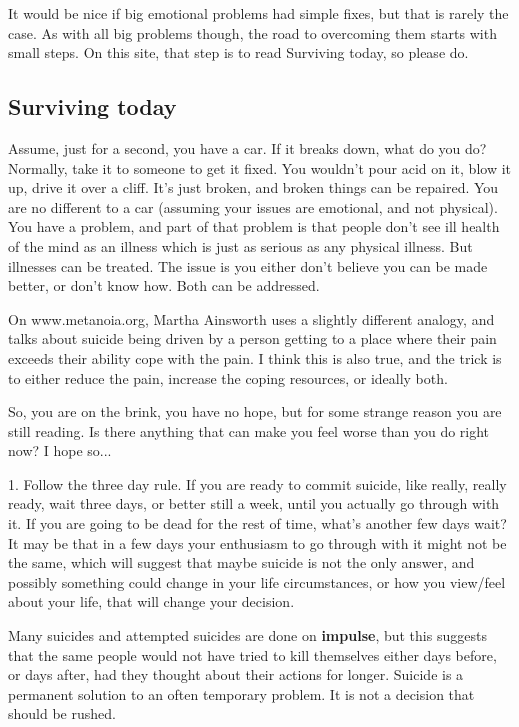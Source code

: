 \documentclass[12pt]{article}
\begin{document}
It would be nice if big emotional problems had simple fixes, but that is rarely the case. As with all big problems though, the road to overcoming them starts with small steps. On this site, that step is to read Surviving today, so please do.

\subsection{Surviving today}

Assume, just for a second, you have a car. If it breaks down, what do you do? Normally, take it to someone to get it fixed. You wouldn't pour acid on it, blow it up, drive it over a cliff. It's just broken, and broken things can be repaired. You are no different to a car (assuming your issues are emotional, and not physical). You have a problem, and part of that problem is that people don't see ill health of the mind as an illness which is just as serious as any physical illness. But illnesses can be treated. The issue is you either don't believe you can be made better, or don't know how. Both can be addressed.

On www.metanoia.org, Martha Ainsworth uses a slightly different analogy, and talks about suicide being driven by a person getting to a place where their pain exceeds their ability cope with the pain. I think this is also true, and the trick is to either reduce the pain, increase the coping resources, or ideally both.

So, you are on the brink, you have no hope, but for some strange reason you are still reading. Is there anything that can make you feel worse than you do right now? I hope so...

1. Follow the three day rule. If you are ready to commit suicide, like really, really ready, wait three days, or better still a week, until you actually go through with it. If you are going to be dead for the rest of time, what's another few days wait? It may be that in a few days your enthusiasm to go through with it might not be the same, which will suggest that maybe suicide is not the only answer, and possibly something could change in your life circumstances, or how you view/feel about your life, that will change your decision.

Many suicides and attempted suicides are done on \textbf{impulse}, but this suggests that the same people would not have tried to kill themselves either days before, or days after, had they thought about their actions for longer. Suicide is a permanent solution to an often temporary problem. It is not a decision that should be rushed.
\end{document}
